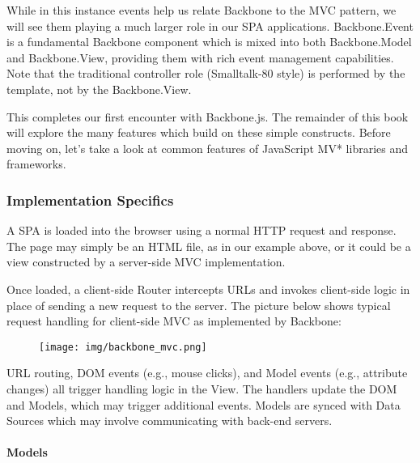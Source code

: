 \documentclass[9pt]{book}
\begin{document}
While in this instance events help us relate Backbone to the MVC
pattern, we will see them playing a much larger role in our SPA
applications. Backbone.Event is a fundamental Backbone component which
is mixed into both Backbone.Model and Backbone.View, providing them with
rich event management capabilities. Note that the traditional controller
role (Smalltalk-80 style) is performed by the template, not by the
Backbone.View.

This completes our first encounter with Backbone.js. The remainder of
this book will explore the many features which build on these simple
constructs. Before moving on, let's take a look at common features of
JavaScript MV* libraries and frameworks.

\subsubsection{Implementation Specifics}\label{implementation-specifics}

A SPA is loaded into the browser using a normal HTTP request and
response. The page may simply be an HTML file, as in our example above,
or it could be a view constructed by a server-side MVC implementation.

Once loaded, a client-side Router intercepts URLs and invokes
client-side logic in place of sending a new request to the server. The
picture below shows typical request handling for client-side MVC as
implemented by Backbone:

\begin{figure}[htbp]
\centering
\texttt{[image: img/backbone\_mvc.png]}
\end{figure}

URL routing, DOM events (e.g., mouse clicks), and Model events (e.g.,
attribute changes) all trigger handling logic in the View. The handlers
update the DOM and Models, which may trigger additional events. Models
are synced with Data Sources which may involve communicating with
back-end servers.

\paragraph{Models}\label{models}
\end{document}

